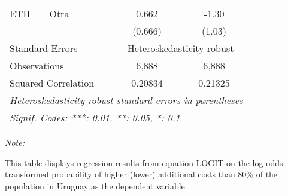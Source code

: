 \begin{table}[htbp!]
\begin{adjustbox}{width = 1\textwidth, max height = 0.95\textheight, center}
\begin{threeparttable}[b]
\begin{tabular}{lcc}
            ETH $=$ Otra              & 0.662          & -1.30\\   
                                      & (0.666)        & (1.03)\\   
            \midrule 
            Standard-Errors & \multicolumn{2}{c}{Heteroskedasticity-robust} \\ 
            Observations              & 6,888          & 6,888\\  
            Squared Correlation       & 0.20834        & 0.21325\\  
            \midrule \midrule
            \multicolumn{3}{l}{\emph{Heteroskedasticity-robust standard-errors in parentheses}}\\
            \multicolumn{3}{l}{\emph{Signif. Codes: ***: 0.01, **: 0.05, *: 0.1}}\\
         \end{tabular}
         
         \begin{tablenotes}\item \medskip \textit{Note:}
            \item This table displays regression results from equation LOGIT on the log-odds transformed probability of higher (lower) additional costs than 80\% of the population in Uruguay as the dependent variable. 
         \end{tablenotes}
      \end{threeparttable}
   \end{adjustbox}
\end{table}


